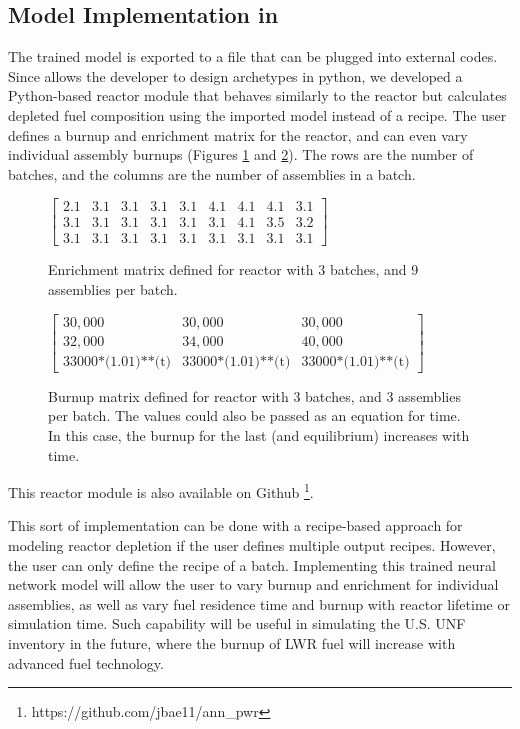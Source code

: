 \subsection{Model Implementation in \Cyclus}

The trained model is exported to a file
that can be plugged into external codes. Since \Cyclus
allows the developer
to design archetypes in python, we developed a Python-based reactor
module that behaves similarly to the \Cycamore reactor
but calculates depleted fuel composition using the
imported model instead of a recipe. The user defines a burnup
and enrichment
matrix for the reactor, and can even vary individual
assembly burnups (Figures \ref{fig:enr_mat} and \ref{fig:bu_mat}). The rows are the number
of batches, and the columns are the number of
assemblies in a batch.
\begin{figure}
\centering
\(
\begin{bmatrix}
2.1 & 3.1 & 3.1 & 3.1 & 3.1 & 4.1 & 4.1 & 4.1 & 3.1 \\
3.1 & 3.1 & 3.1 & 3.1 & 3.1 & 3.1 & 4.1 & 3.5 & 3.2 \\
3.1 & 3.1 & 3.1 & 3.1 & 3.1 & 3.1 & 3.1 & 3.1 & 3.1
\end{bmatrix}
\)
\caption{Enrichment matrix defined for reactor with 3 batches,
         and 9 assemblies per batch.}
\label{fig:enr_mat}
\end{figure}

\begin{figure}
\centering
\(
\begin{bmatrix}
30,000 & 30,000 & 30,000 \\
32,000 & 34,000 & 40,000 \\
\text{33000*(1.01)**(t)} & \text{33000*(1.01)**(t)} & \text{33000*(1.01)**(t)}
\end{bmatrix}
\)
\caption{Burnup matrix defined for reactor with 3 batches, and 3 assemblies
         per batch. The values could also be passed as an equation for time. In this case, the burnup for the last (and equilibrium) increases with time.}
\label{fig:bu_mat}
\end{figure}

This reactor module is also
available on Github \footnote{https://github.com/jbae11/ann\_pwr}.

This sort of implementation can be done with
a recipe-based approach for modeling reactor depletion
if the user defines multiple
output recipes. However, the user can only define
the recipe of a batch.
Implementing this trained neural network model will allow the user to vary
burnup and enrichment for individual assemblies, as well
as vary fuel residence time and burnup with reactor
lifetime or simulation time. Such capability will be
useful in simulating the U.S. \gls{UNF} inventory in the future,
where the burnup of \gls{LWR} fuel will increase
with advanced fuel technology.